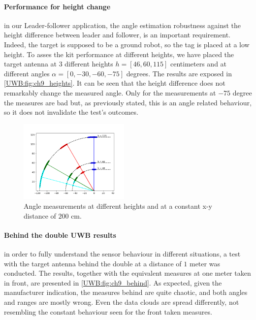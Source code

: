 \paragraph{Performance for height change}
in our Leader-follower application, the angle estimation robustness against the height difference between leader and follower, is an important requirement. Indeed, the target is supposed to be a ground robot, so the tag is placed at a low height. To asses the kit performance at different heights, we have placed the target antenna at 3 different heights $h=[46,60,115]$ centimeters and at different angles $\alpha = [0,-30,-60,-75]$ degrees. The results are exposed in \autoref{UWB:fig:ch9_heights}. It can be seen that the height difference does not remarkably change the measured angle. Only for the measurements at $-75$ degree the measures are bad but, as previously stated, this is an angle related behaviour, so it does not invalidate the test's outcomes.\\

\begin{figure}
    \centering
    \includegraphics[width=0.48\textwidth]{images/characterization/ch9_heights.png}
    \caption{Angle measurements at different heights and at a constant x-y distance of $200$ cm.}
    \label{UWB:fig:ch9_heights}
\end{figure}

\paragraph{Behind the double UWB results}
in order to fully understand the sensor behaviour in different situations, a test with the target antenna behind the double at a distance of $1$ meter was conducted. The results, together with the equivalent measures at one meter taken in front, are presented in \autoref{UWB:fig:ch9_behind}. As expected, given the manufacturer indication, the measures behind are quite chaotic, and both angles and ranges are mostly wrong. Even the data clouds are spread differently, not resembling the constant behaviour seen for the front taken measures.\\

